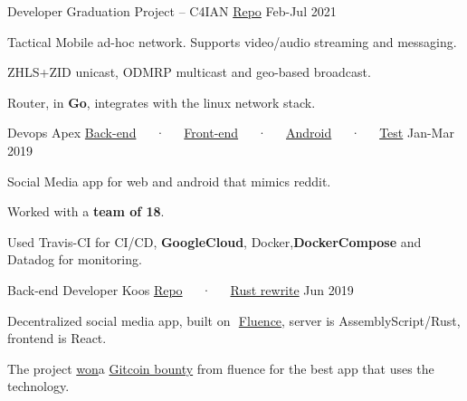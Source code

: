 

\begin{cventries}

  
  \cventry
  {Developer} %
  {Graduation Project -- C4IAN \tiny{\href{https://www.github.com/mido3ds/C4IAN}{Repo}}} %
  {} %
  {Feb-Jul 2021} %
  {
    \begin{cvitems} %
      \item {Tactical Mobile ad-hoc network. Supports video/audio streaming and messaging.}
      \item {ZHLS+ZID unicast, ODMRP multicast and geo-based broadcast.}
      \item {Router, in \textbf{Go}, integrates with the linux network stack.}
    \end{cvitems}
  }

  \cventry
    {Devops} %
    {Apex \tiny{\href{https://www.github.com/DarkGeekMS/ApeX-Server}{Back-end}~~~·~~~\href{http://www.github.com/DarkGeekMS/ApeX-Web}{Front-end}~~~·~~~\href{http://www.github.com/DarkGeekMS/ApeX-Mobile}{Android}~~~·~~~\href{https://www.github.com/DarkGeekMS/apeXTesting}{Test}}} %
    {} %
    {Jan-Mar 2019} %
    {
      \begin{cvitems} %
        \item {Social Media app for web and android that mimics reddit.}
        \item {Worked with a \textbf{team of 18}.}
        \item {Used ​Travis-CI ​for CI/CD, \textbf{​GoogleCloud​}, Docker, \textbf{​DockerCompose​} and Datadog for monitoring.}
      \end{cvitems}
    }

  \cventry
    {Back-end Developer} %
    {Koos \tiny{\href{https://gitlab.com/koos-project/koos}{Repo}~~~·~~~\href{https://gitlab.com/koos-project/koos/tree/rust-migration/server}{Rust rewrite}}} %
    {} %
    {Jun 2019} %
    {
      \begin{cvitems} %
        \item {Decentralized social media app, built on ​ \href{http://fluence.dev/}{Fluence​}, server is AssemblyScript/Rust, frontend is React.}
        \item {The project \href{https://www.linkedin.com/feed/update/urn:li:activity:6575339127934341120/}{​won​} a ​\href{https://gitcoin.co/issue/fluencelabs/Bounties/1/3290}{Gitcoin bounty​} from fluence for the best app that uses the technology.}
      \end{cvitems}
    }


\end{cventries}

